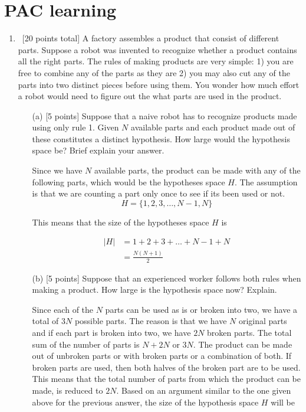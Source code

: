 \section{PAC learning}
\label{sec:pac-learning}
\begin{enumerate}

\item ~[20 points total] A factory assembles a product that consist of
  different parts. Suppose a robot was invented to recognize whether a
  product contains all the right parts. The rules of making products
  are very simple: 1) you are free to combine any of the parts as they
  are 2) you may also cut any of the parts into two distinct pieces
  before using them. You wonder how much effort a robot would need to
  figure out the what parts are used in the product.

\begin{itemize}
\item[(a)] [5 points] Suppose that a naive robot has to recognize
  products made using only rule 1. Given $N$ available parts and each
  product made out of these constitutes a distinct hypothesis. How
  large would the hypothesis space be? Brief explain your answer.
    
Since we have $N$ available parts, the product can be made with any of the following parts, which would be the hypotheses space $H$. The assumption is that we are counting a part only once to see if its been used or not.
$$
H = \{1, 2, 3,\ldots, N-1, N \}
$$

This means that the size of the hypotheses space $H$ is 

\begin{equation*}
\begin{aligned}
\left | H \right | &= 1 + 2 + 3 + \ldots + N-1 + N\\
&= \frac{N (N+1)}{2}
\end{aligned}
\end{equation*}

\item[(b)] [5 points] Suppose that an experienced worker follows both
  rules when making a product. How large is the hypothesis space now?
  Explain.

Since each of the $N$ parts can be used as is or broken into two, we have a total of $3N$  possible parts. The reason is that we have $N$ original parts and if each part is broken into two, we have $2N$ broken parts. The total sum of the number of parts is $N + 2N$ or $3N$. The product can be made out of unbroken parts or with broken parts or a combination of both. If broken parts are used, then both halves of the broken part are to be used. This means that the total number of parts from which the product can be made, is reduced to $2N$. Based on an argument similar to the one given above for the previous answer, the size of the hypothesis space $H$ will be


\end{itemize}
\end{enumerate}
